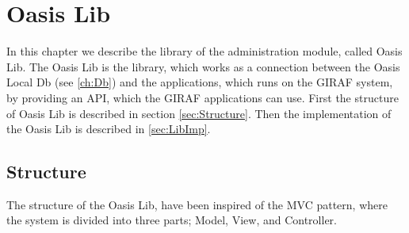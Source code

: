 \chapter{Oasis Lib}
\label{ch:Lib}
In this chapter we describe the library of the administration module, called Oasis Lib. The Oasis Lib is the library, which works as a connection between the Oasis Local Db (see \autoref{ch:Db}) and the applications, which runs on the GIRAF system, by providing an API, which the GIRAF applications can use. First the structure of Oasis Lib is described in section \vref{sec:Structure}. Then the implementation of the Oasis Lib is described in \autoref{sec:LibImp}.

\section{Structure}
\label{sec:Structure}
The structure of the Oasis Lib, have been inspired of the MVC pattern, where the system is divided into three parts; Model, View, and Controller. 

